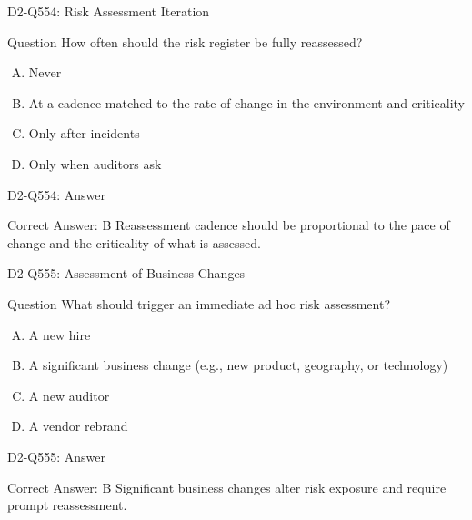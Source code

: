 \documentclass{beamer}
\begin{document}
	\begin{frame}{D2-Q554: Risk Assessment Iteration}
		\begin{block}{Question}
			How often should the risk register be fully reassessed?
		\end{block}
		\begin{enumerate}[(A)]
			\item Never
			\item At a cadence matched to the rate of change in the environment and criticality
			\item Only after incidents
			\item Only when auditors ask
		\end{enumerate}
	\end{frame}
	\begin{frame}{D2-Q554: Answer}
		\begin{block}{Correct Answer: B}
			Reassessment cadence should be proportional to the pace of change and the criticality of what is assessed.
		\end{block}
	\end{frame}
	
	\begin{frame}{D2-Q555: Assessment of Business Changes}
		\begin{block}{Question}
			What should trigger an immediate ad hoc risk assessment?
		\end{block}
		\begin{enumerate}[(A)]
			\item A new hire
			\item A significant business change (e.g., new product, geography, or technology)
			\item A new auditor
			\item A vendor rebrand
		\end{enumerate}
	\end{frame}
	\begin{frame}{D2-Q555: Answer}
		\begin{block}{Correct Answer: B}
			Significant business changes alter risk exposure and require prompt reassessment.
		\end{block}
	\end{frame}
	
\end{document}
